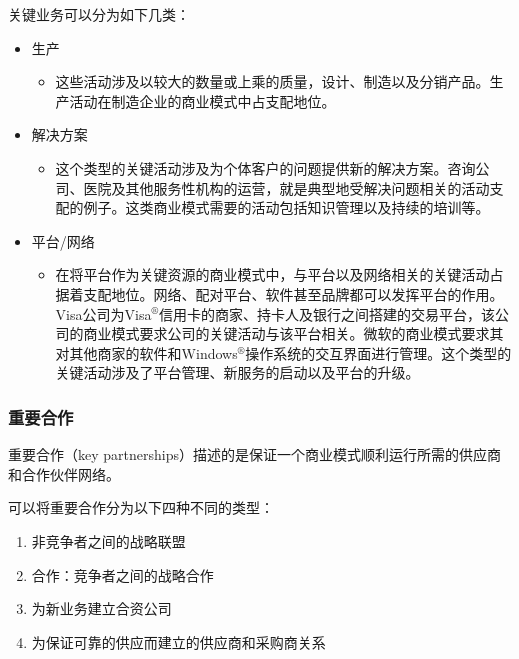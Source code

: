 	关键业务可以分为如下几类：
	\begin{itemize}
		\item 生产
		\begin{itemize}
			\item 这些活动涉及以较大的数量或上乘的质量，设计、制造以及分销产品。生产活动在制造企业的商业模式中占支配地位。
		\end{itemize}
		\item 解决方案
		\begin{itemize}
			\item 这个类型的关键活动涉及为个体客户的问题提供新的解决方案。咨询公司、医院及其他服务性机构的运营，就是典型地受解决问题相关的活动支配的例子。这类商业模式需要的活动包括知识管理以及持续的培训等。
		\end{itemize}
		\item 平台/网络
		\begin{itemize}
			\item 在将平台作为关键资源的商业模式中，与平台以及网络相关的关键活动占据着支配地位。网络、配对平台、软件甚至品牌都可以发挥平台的作用。Visa公司为Visa$^\circledR$信用卡的商家、持卡人及银行之间搭建的交易平台，该公司的商业模式要求公司的关键活动与该平台相关。微软的商业模式要求其对其他商家的软件和Windows$^\circledR$操作系统的交互界面进行管理。这个类型的关键活动涉及了平台管理、新服务的启动以及平台的升级。
		\end{itemize}
	\end{itemize}


	\subsubsection{重要合作}
	重要合作（key partnerships）描述的是保证一个商业模式顺利运行所需的供应商和合作伙伴网络。

	可以将重要合作分为以下四种不同的类型：
	\begin{enumerate}[label=\arabic*.]
		\item 非竞争者之间的战略联盟
		\item 合作：竞争者之间的战略合作
		\item 为新业务建立合资公司
		\item 为保证可靠的供应而建立的供应商和采购商关系
	\end{enumerate}

